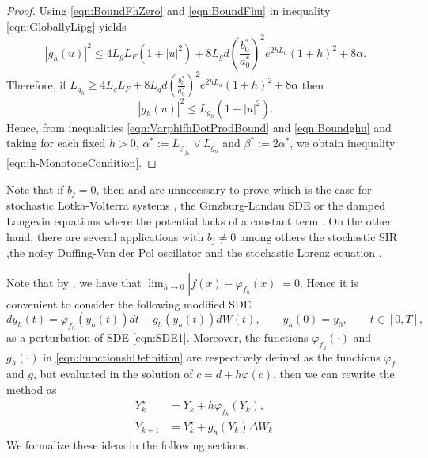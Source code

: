 \begin{proof}
Using \eqref{eqn:BoundFhZero} and \eqref{eqn:BoundFhu} in  inequality \eqref{eqn:GloballyLipg} yields
\begin{equation*}
	|g_h(u)|^2 \leq
		4 L_g L_F(1+|u|^2)
		+ 8 L_g d
		\left(
			\frac{b_0^*}{a_0^*}
		\right)^2
		e^{2h L_a} (1+h)^2
		+8 \alpha.
\end{equation*}
Therefore, if
$
	L_{g_h} 
	\geq 
	4 L_g L_F + 8 L_g d
	\left(
		\frac{b_0^*}{a_0^*}
	\right)^2
	e^{2h L_a} (1+h)^2
	+8 \alpha		  
$
then
\begin{equation}\label{eqn:Boundghu}
	|g_h(u)|^2
	\leq
		L_{g_h}(1+|u|^2).		
\end{equation}
Hence, from inequalities \eqref{eqn:VarphifhDotProdBound} and \eqref{eqn:Boundghu} 
and taking for each fixed $h>0$, $\alpha^* := L_{\varphi_{f_h}}\vee L_{g_h}$ and
$\beta^* := 2\alpha^*$, we obtain inequality  \eqref{eqn:h-MonotoneCondition}.
\end{proof}
%
\begin{remark}\label{rmk:PertrubedSDE}
	Note that if $b_j=0$, then  and  are unnecessary to 
	prove which is the case for stochastic Lotka-Volterra systems \cite{Mao2002,Mao2003},  
	the Ginzburg-Landau SDE \cite{Kloeden1992} or the damped Langevin equations where the potential lacks of a 
	constant term \cite{Hutzenthaler2012a}. On the other hand, there are several applications with $b_j\neq 0$ 
	among others the stochastic SIR \cite{Tornatore2005},the noisy Duffing-Van der Pol oscillator 
	\cite{Schenk-Hoppe1996b} and the stochastic Lorenz equation \cite{Gao2002}.
\end{remark}
\begin{remark}\label{rmk:PertrubedSDE}
	Note that by , we have that 
	$\displaystyle\lim_{h\to 0}|f(x)-\varphi_{f_h}(x)|=0$.
	Hence it is convenient to  consider the following modified SDE
	\begin{equation*} %
		dy_h(t)= \varphi_{f_h}(y_h(t))dt +g_h(y_h(t))dW(t),
		\qquad y_h(0)=y_0,  \qquad t\in [0,T],
	\end{equation*}
	as a perturbation of SDE \eqref{eqn:SDE1}. 
	Moreover, the functions $\varphi_{f_h}(\cdot)$ and $g_h(\cdot)$ in \eqref{eqn:FunctionshDefinition} are
	respectively defined as the functions $\varphi_{f}$ and $g$, but  evaluated in the solution of $c=d + h\varphi(c)$, 
	then we can rewrite the \SM method  as
	\begin{align*}
		Y_k^{\star} &= Y_k + h \varphi_{f_h}(Y_k),\\
		Y_{k+1} &= Y_k^{\star} + g_h(Y_k)\Delta W_k.
	\end{align*}
	We formalize these ideas in the following sections.
\end{remark}
%
